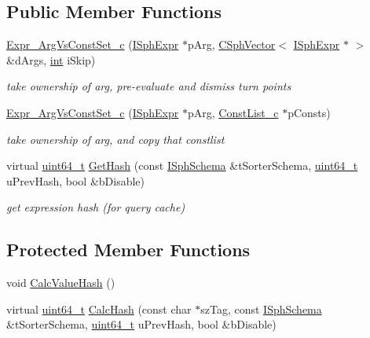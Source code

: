 \subsection*{Public Member Functions}
\begin{DoxyCompactItemize}
\item 
\hyperlink{classExpr__ArgVsConstSet__c_a4e2d6743658c6fabd19700ae5b713790}{Expr\-\_\-\-Arg\-Vs\-Const\-Set\-\_\-c} (\hyperlink{structISphExpr}{I\-Sph\-Expr} $\ast$p\-Arg, \hyperlink{classCSphVector}{C\-Sph\-Vector}$<$ \hyperlink{structISphExpr}{I\-Sph\-Expr} $\ast$ $>$ \&d\-Args, \hyperlink{sphinxexpr_8cpp_a4a26e8f9cb8b736e0c4cbf4d16de985e}{int} i\-Skip)
\begin{DoxyCompactList}\small\item\em take ownership of arg, pre-\/evaluate and dismiss turn points \end{DoxyCompactList}\item 
\hyperlink{classExpr__ArgVsConstSet__c_a3b4ce2d9096e12123e4d936cad8e07b0}{Expr\-\_\-\-Arg\-Vs\-Const\-Set\-\_\-c} (\hyperlink{structISphExpr}{I\-Sph\-Expr} $\ast$p\-Arg, \hyperlink{classConstList__c}{Const\-List\-\_\-c} $\ast$p\-Consts)
\begin{DoxyCompactList}\small\item\em take ownership of arg, and copy that constlist \end{DoxyCompactList}\item 
virtual \hyperlink{sphinxstd_8h_aaa5d1cd013383c889537491c3cfd9aad}{uint64\-\_\-t} \hyperlink{classExpr__ArgVsConstSet__c_a4be34d5625a4960dbea8ca47e6d867ad}{Get\-Hash} (const \hyperlink{classISphSchema}{I\-Sph\-Schema} \&t\-Sorter\-Schema, \hyperlink{sphinxstd_8h_aaa5d1cd013383c889537491c3cfd9aad}{uint64\-\_\-t} u\-Prev\-Hash, bool \&b\-Disable)
\begin{DoxyCompactList}\small\item\em get expression hash (for query cache) \end{DoxyCompactList}\end{DoxyCompactItemize}
\subsection*{Protected Member Functions}
\begin{DoxyCompactItemize}
\item 
void \hyperlink{classExpr__ArgVsConstSet__c_a9471df13fe0ffe92742e711d321f8556}{Calc\-Value\-Hash} ()
\item 
virtual \hyperlink{sphinxstd_8h_aaa5d1cd013383c889537491c3cfd9aad}{uint64\-\_\-t} \hyperlink{classExpr__ArgVsConstSet__c_a5d38584111975db89e3136fba3e99784}{Calc\-Hash} (const char $\ast$sz\-Tag, const \hyperlink{classISphSchema}{I\-Sph\-Schema} \&t\-Sorter\-Schema, \hyperlink{sphinxstd_8h_aaa5d1cd013383c889537491c3cfd9aad}{uint64\-\_\-t} u\-Prev\-Hash, bool \&b\-Disable)
\end{DoxyCompactItemize}
